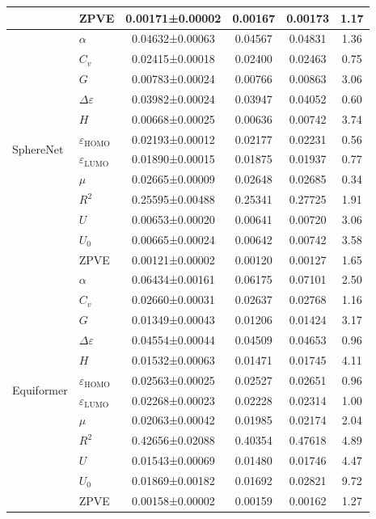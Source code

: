 \begin{table}[!htb]
\begin{tabular}{llcccc}
    & ZPVE & 0.00171±0.00002 & 0.00167 & 0.00173 & 1.17 \\
    \midrule
    \multirow{12}{*}{SphereNet}
    & $\alpha$ & 0.04632±0.00063 & 0.04567 & 0.04831 & 1.36 \\
    & $C_v$ & 0.02415±0.00018 & 0.02400 & 0.02463 & 0.75 \\
    & $G$ & 0.00783±0.00024 & 0.00766 & 0.00863 & 3.06 \\
    & $\Delta\varepsilon$ & 0.03982±0.00024 & 0.03947 & 0.04052 & 0.60 \\
    & $H$ & 0.00668±0.00025 & 0.00636 & 0.00742 & 3.74 \\
    & $\varepsilon_{\text{HOMO}}$ & 0.02193±0.00012 & 0.02177 & 0.02231 & 0.56 \\
    & $\varepsilon_{\text{LUMO}}$ & 0.01890±0.00015 & 0.01875 & 0.01937 & 0.77 \\
    & $\mu$ & 0.02665±0.00009 & 0.02648 & 0.02685 & 0.34 \\
    & $R^2$ & 0.25595±0.00488 & 0.25341 & 0.27725 & 1.91 \\
    & $U$ & 0.00653±0.00020 & 0.00641 & 0.00720 & 3.06 \\
    & $U_0$ & 0.00665±0.00024 & 0.00642 & 0.00742 & 3.58 \\
    & ZPVE & 0.00121±0.00002 & 0.00120 & 0.00127 & 1.65 \\
    \midrule
    \multirow{12}{*}{Equiformer}
    & $\alpha$ & 0.06434±0.00161 & 0.06175 & 0.07101 & 2.50 \\
    & $C_v$ & 0.02660±0.00031 & 0.02637 & 0.02768 & 1.16 \\
    & $G$ & 0.01349±0.00043 & 0.01206 & 0.01424 & 3.17 \\
    & $\Delta\varepsilon$ & 0.04554±0.00044 & 0.04509 & 0.04653 & 0.96 \\
    & $H$ & 0.01532±0.00063 & 0.01471 & 0.01745 & 4.11 \\
    & $\varepsilon_{\text{HOMO}}$ & 0.02563±0.00025 & 0.02527 & 0.02651 & 0.96 \\
    & $\varepsilon_{\text{LUMO}}$ & 0.02268±0.00023 & 0.02228 & 0.02314 & 1.00 \\
    & $\mu$ & 0.02063±0.00042 & 0.01985 & 0.02174 & 2.04 \\
    & $R^2$ & 0.42656±0.02088 & 0.40354 & 0.47618 & 4.89 \\
    & $U$ & 0.01543±0.00069 & 0.01480 & 0.01746 & 4.47 \\
    & $U_0$ & 0.01869±0.00182 & 0.01692 & 0.02821 & 9.72 \\
    & ZPVE & 0.00158±0.00002 & 0.00159 & 0.00162 & 1.27 \\
    \bottomrule
    \end{tabular}
\end{table}

